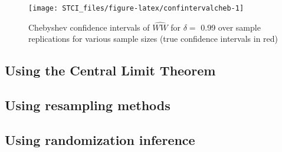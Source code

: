 \documentclass[]{book}
\newenvironment{Shaded}{\begin{snugshade}}{\end{snugshade}}
\newcommand{\KeywordTok}[1]{\textcolor[rgb]{0.13,0.29,0.53}{\textbf{#1}}}
\newcommand{\DataTypeTok}[1]{\textcolor[rgb]{0.13,0.29,0.53}{#1}}
\newcommand{\DecValTok}[1]{\textcolor[rgb]{0.00,0.00,0.81}{#1}}
\newcommand{\StringTok}[1]{\textcolor[rgb]{0.31,0.60,0.02}{#1}}
\newcommand{\OperatorTok}[1]{\textcolor[rgb]{0.81,0.36,0.00}{\textbf{#1}}}
\newcommand{\NormalTok}[1]{#1}
\theoremstyle{definition}
\theoremstyle{definition}
\theoremstyle{definition}
\theoremstyle{remark}
\begin{document}
\begin{Shaded}
\end{Shaded}

\begin{figure}[htbp]

{\centering \texttt{[image: STCI\_files/figure-latex/confintervalcheb-1]} 

}

\caption{Chebyshev confidence intervals of $\hat{WW}$ for $\delta=$ 0.99 over sample replications for various sample sizes (true confidence intervals in red)}\label{fig:confintervalcheb}
\end{figure}

\subsection{Using the Central Limit Theorem}\label{sec:CLT}

\subsection{Using resampling methods}\label{sec:resamp}

\subsection{Using randomization inference}\label{sec:Fisher}
\end{document}
